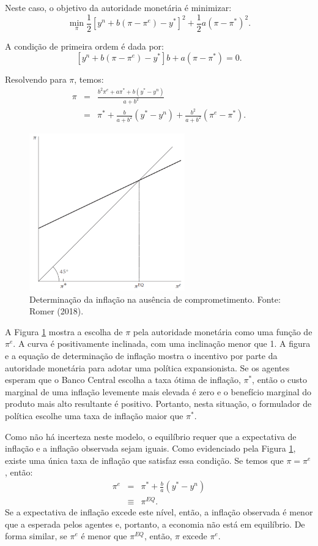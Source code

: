 \documentclass[12pt]{article}
\begin{document}
Neste caso, o objetivo da autoridade monetária é minimizar:
\begin{equation}
    \min_{\pi} \frac{1}{2}[y^n + b(\pi-\pi^e) - y^*]^2 + \frac{1}{2}a(\pi-\pi^*)^2.
    \label{eq3}
\end{equation}

A condição de primeira ordem é dada por:
\[
[y^n + b(\pi-\pi^e) - y^*]b + a(\pi-\pi^*) = 0.
\]

Resolvendo para $\pi$, temos:
\begin{eqnarray*}
\pi &=& \frac{b^2\pi^e + a\pi^* + b(y^*-y^n)}{a + b^2} \\
&=& \pi^* + \frac{b}{a+b^2}(y^*-y^n) + \frac{b^2}{a+b^2}(\pi^e-\pi^*).
\end{eqnarray*}

\begin{figure}[h!]
    \centering
    \includegraphics[width=0.6\textwidth]{./figures/aula13_fig1.PNG}
    \caption{Determinação da inflação na ausência de comprometimento. Fonte: Romer (2018).}
    \label{fig1}
\end{figure}

A Figura \ref{fig1} mostra a escolha de $\pi$ pela autoridade monetária como uma função de $\pi^e$. A curva é positivamente inclinada, com uma inclinação menor que 1. A figura e a equação de determinação de inflação mostra o incentivo por parte da autoridade monetária para adotar uma política expansionista. Se os agentes esperam que o Banco Central escolha a taxa ótima de inflação, $\pi^*$, então o custo marginal de uma inflação levemente mais elevada é zero e o benefício marginal do produto mais alto resultante é positivo. Portanto, nesta situação, o formulador de política escolhe uma taxa de inflação maior que $\pi^*$.

Como não há incerteza neste modelo, o equilíbrio requer que a expectativa de inflação e a inflação observada sejam iguais. Como evidenciado pela Figura \ref{fig1}, existe uma única taxa de inflação que satisfaz essa condição. Se temos que $\pi = \pi^e$, então:
\begin{eqnarray*}
\pi^e &=& \pi^* + \frac{b}{a}(y^*-y^n) \\
&\equiv& \pi^{EQ}.
\end{eqnarray*}
Se a expectativa de inflação excede este nível, então, a inflação observada é menor que a esperada pelos agentes e, portanto, a economia não está em equilíbrio. De forma similar, se $\pi^e$ é menor que $\pi^{EQ}$, então, $\pi$ excede $\pi^e$.
\end{document}

